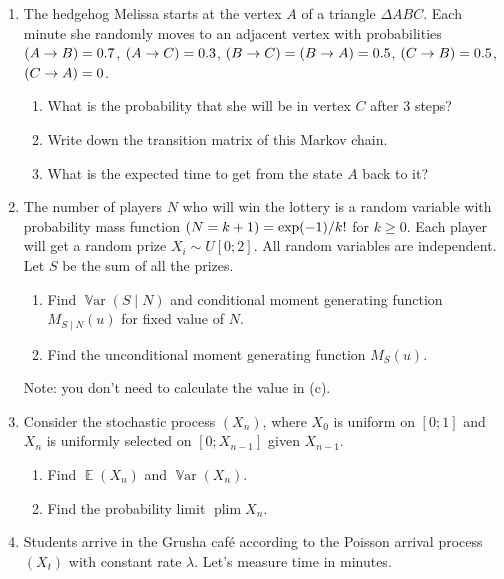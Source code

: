 \documentclass[12pt]{article}
\DeclareMathOperator{\Var}{\mathbb{V}ar}
\let\P\relax
\DeclareMathOperator{\P}{\mathbb{P}}
\DeclareMathOperator{\plim}{\mathrm{plim}}
\DeclareMathOperator{\E}{\mathbb{E}}
\begin{document}
\begin{enumerate}
  \item The hedgehog Melissa starts at the vertex $A$ of a triangle $\Delta ABC$.
  Each minute she randomly moves to an adjacent vertex with probabilities $\P(A \to B) = 0.7$, 
  $\P(A \to C) = 0.3$, $\P(B \to C) = \P(B \to A) = 0.5$,  $\P(C \to B) = 0.5$,  $\P(C \to A) = 0$.

  \begin{enumerate}
    \item What is the probability that she will be in vertex $C$ after 3 steps?
    \item Write down the transition matrix of this Markov chain. 
    \item What is the expected time to get from the state $A$ back to it?
  \end{enumerate}
  
  \item The number of players $N$ who will win the lottery
  is a random variable with probability mass function $\P(N = k + 1) = \exp(-1)/k!$ for $k\geq 0$.
  Each player will get a random prize $X_i \sim U[0;2]$.
  All random variables are independent. 
  Let $S$ be the sum of all the prizes. 

  \begin{enumerate}
    \item Find $\Var(S \mid N)$ and conditional moment generating function $M_{S\mid N}(u)$ for fixed value of $N$.
    \item Find the unconditional moment generating function $M_S(u)$.
  \end{enumerate}

  Note: you don't need to calculate the value in (c). 
  
  \item Consider the stochastic process $(X_n)$, where $X_0$ is uniform on $[0;1]$ and
  $X_n$ is uniformly selected on $[0; X_{n-1}]$ given $X_{n-1}$.

  \begin{enumerate}
    \item Find $\E(X_n)$ and $\Var(X_n)$.
    \item Find the probability limit $\plim X_n$.
  \end{enumerate}
  
  \item Students arrive in the Grusha café according to the Poisson arrival process $(X_t)$ 
  with constant rate $\lambda$. Let's measure time in minutes.


\end{enumerate}
\end{document}
